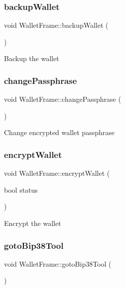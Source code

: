 \subsubsection{\texorpdfstring{backupWallet}{backupWallet}}
{\footnotesize\ttfamily void Wallet\+Frame\+::backup\+Wallet (\begin{DoxyParamCaption}{ }\end{DoxyParamCaption})\hspace{0.3cm}{\ttfamily [slot]}}

Backup the wallet \mbox{\label{class_wallet_frame_a0a4026a734acdc0f5fbd5f775c167443}} 
\subsubsection{\texorpdfstring{changePassphrase}{changePassphrase}}
{\footnotesize\ttfamily void Wallet\+Frame\+::change\+Passphrase (\begin{DoxyParamCaption}{ }\end{DoxyParamCaption})\hspace{0.3cm}{\ttfamily [slot]}}

Change encrypted wallet passphrase \mbox{\label{class_wallet_frame_a8a9a419ba3e249f29fe321f2d789b761}} 
\subsubsection{\texorpdfstring{encryptWallet}{encryptWallet}}
{\footnotesize\ttfamily void Wallet\+Frame\+::encrypt\+Wallet (\begin{DoxyParamCaption}\item[{bool}]{status }\end{DoxyParamCaption})\hspace{0.3cm}{\ttfamily [slot]}}

Encrypt the wallet \mbox{\label{class_wallet_frame_a0a22b92967e8811dcf4637fe6774fef1}} 
\subsubsection{\texorpdfstring{gotoBip38Tool}{gotoBip38Tool}}
{\footnotesize\ttfamily void Wallet\+Frame\+::goto\+Bip38\+Tool (\begin{DoxyParamCaption}{ }\end{DoxyParamCaption})\hspace{0.3cm}{\ttfamily [slot]}}

